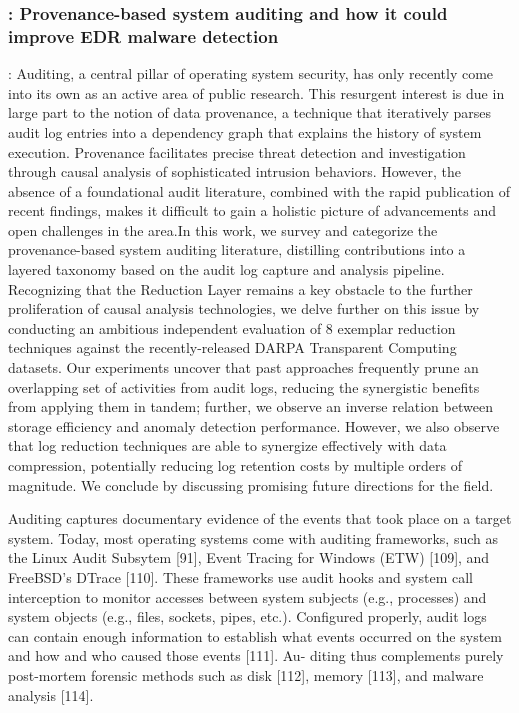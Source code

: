 \documentclass{article}
\begin{document}
\subsubsection{\textcite{Inam:2023}: Provenance-based system auditing and how it could improve EDR malware detection}
\textbf{}:  Auditing, a central pillar of operating system security, has only recently come into its own as an active area of public research. This resurgent interest is due in large part to the notion of data provenance, a technique that iteratively parses audit log entries into a dependency graph that explains the history of system execution. Provenance facilitates precise threat detection and investigation through causal analysis of sophisticated intrusion behaviors. However, the absence of a foundational audit literature, combined with the rapid publication of recent findings, makes it difficult to gain a holistic picture of advancements and open challenges in the area.In this work, we survey and categorize the provenance-based system auditing literature, distilling contributions into a layered taxonomy based on the audit log capture and analysis pipeline. Recognizing that the Reduction Layer remains a key obstacle to the further proliferation of causal analysis technologies, we delve further on this issue by conducting an ambitious independent evaluation of 8 exemplar reduction techniques against the recently-released DARPA Transparent Computing datasets. Our experiments uncover that past approaches frequently prune an overlapping set of activities from audit logs, reducing the synergistic benefits from applying them in tandem; further, we observe an inverse relation between storage efficiency and anomaly detection performance. However, we also observe that log reduction techniques are able to synergize effectively with data compression, potentially reducing log retention costs by multiple orders of magnitude. We conclude by discussing promising future directions for the field.

Auditing captures documentary evidence of the events that took place on a target system. Today, most operating systems come with auditing frameworks, such as the Linux Audit Subsytem [91], Event Tracing for Windows (ETW) [109], and FreeBSD’s DTrace [110]. These frameworks use audit hooks and system call interception to monitor accesses between system subjects (e.g., processes) and system objects (e.g., files, sockets, pipes, etc.). Configured properly, audit logs can contain enough information to establish what events occurred on the system and how and who caused those events [111]. Au- diting thus complements purely post-mortem forensic methods such as disk [112], memory [113], and malware analysis [114].
\end{document}
